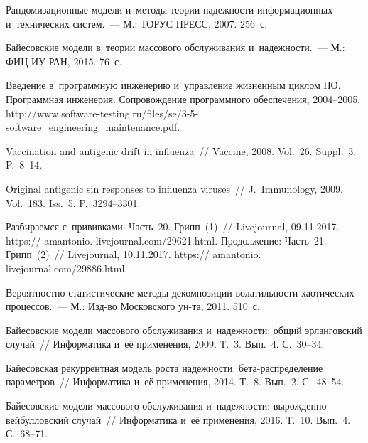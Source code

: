 \begin{multicols}{2}
{{\begin{thebibliography}{99}
Рандомизационные модели и~методы тео\-рии на\-деж\-ности информационных 
и~технических сис\-тем.~--- М.: ТОРУС ПРЕСС, 2007. 256~с.

Байесовские модели в~тео\-рии массового обслуживания и~надежности.~--- 
М.: ФИЦ ИУ РАН, 2015. 76~с.

Введение в~программную инженерию и~управ\-ле\-ние жизненным циклом ПО. 
Программная инженерия. Сопровождение программного обеспечения, 2004--2005.
{\sf http://www.\linebreak software-testing.ru/files/se/3-5-software\_engineering\_\linebreak maintenance.pdf}.

Vaccination and antigenic drift in influenza~// Vaccine, 2008. Vol.~26. Suppl.~3. 
P.~8--14.

Original antigenic sin responses to influenza viruses~// 
J.~Immunology, 2009.
Vol.~183. Iss.~5. P.~3294--3301.

 Разбираемся с~прививками. Часть~20. 
Грипп~(1)~// Livejournal, 09.11.2017. 
{\sf https:// amantonio. livejournal.com/29621.html}. Продолжение: Часть~21. 
Грипп~(2)~// Livejournal, 10.11.2017. 
{\sf https:// amantonio. livejournal.com/29886.html}.





Ве\-ро\-ят\-но\-ст\-но-ста\-ти\-сти\-че\-ские 
методы декомпозиции волатильности хаотических процессов.~--- 
М.: Изд-во Московского ун-та, 2011. 510~с.

Байесовские модели массового обслуживания и~надежности: общий эрланговский случай~// 
Информатика и~её применения, 2009. Т.~3. Вып.~4. С.~30--34.

Байесовская рекуррентная модель роста на\-деж\-ности: бе\-та-рас\-пре\-де\-ле\-ние параметров~// 
Информатика и~её применения, 2014. Т.~8. Вып.~2. С.~48--54.

Байесовские модели массового обслуживания и~надежности: 
вы\-рож\-ден\-но-вей\-бул\-лов\-ский случай~// Информатика и~её применения, 2016. Т.~10. Вып.~4. С.~68--71.


\end{thebibliography}}}
\end{multicols}
